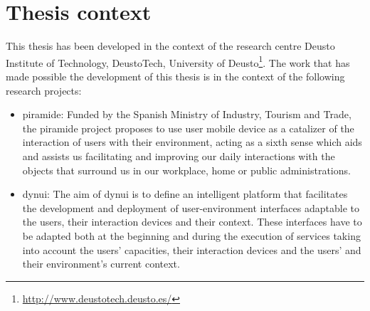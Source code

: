 
\section{Thesis context}
\label{sec:thesis_context}

This thesis has been developed in the context of the research centre Deusto
Institute of Technology, DeustoTech, University of Deusto\footnote{\url{http://www.deustotech.deusto.es/}}.
The work that has made possible the development of this thesis is in the context 
of the following research projects:

\begin{itemize}
  \item \acs{piramide}: Funded by the Spanish Ministry of Industry, Tourism and 
  Trade, the \ac{piramide} project proposes to use user mobile device as a 
  catalizer of the interaction of users with their environment, acting as a 
  sixth sense which aids and assists us facilitating and improving our daily 
  interactions with the objects that surround us in our workplace, home or 
  public administrations.
  
  
  \item \acs{dynui}: The aim of \ac{dynui} is to define an intelligent 
  platform that facilitates the development and deployment of user-environment 
  interfaces adaptable to the users, their interaction devices and their 
  context. These interfaces have to be adapted both at the beginning and 
  during the execution of services taking into account the users' capacities, 
  their interaction devices and the users' and their environment's current 
  context.
 
\end{itemize}





